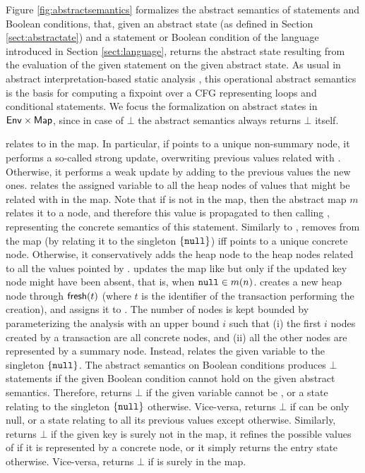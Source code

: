 Figure \ref{fig:abstractsemantics} formalizes the abstract semantics of statements and Boolean conditions, that, given an abstract state (as defined in Section \ref{sect:abstractate}) and a statement or Boolean condition of the language introduced in Section \ref{sect:language}, returns the abstract state resulting from the evaluation of the given statement on the given abstract state.
As usual in abstract interpretation-based static analysis \cite{CC77}, this operational abstract semantics is the basis for computing a fixpoint over a CFG representing loops and conditional statements.
We focus the formalization on abstract states in $\mathsf{Env} \times \mathsf{Map}$, since in case of $\bot$ the abstract semantics always returns $\bot$ itself.

 relates  to  in the map. In particular, if  points to a unique non-summary node, it performs a so-called strong update, overwriting previous values related with . Otherwise, it performs a weak update by adding to the previous values the new ones.  relates the assigned variable  to all the heap nodes of values that might be related with  in the map. Note that if  is not in the map, then the abstract map $m$ relates it to a  node, and therefore this value is propagated to  then calling , representing the concrete semantics of this statement. Similarly to ,  removes  from the map (by relating it to the singleton $\{\mathtt{null}\}$) iff  points to a unique concrete node. Otherwise, it conservatively adds the heap node  to the heap nodes related to all the values pointed by .  updates the map like  but only if the updated key node might have been absent, that is, when $\mathtt{null} \in m(n)$.  creates a new heap node through $\mathsf{fresh}(t)$ (where $t$ is the identifier of the transaction performing the creation), and assigns it to . The number of nodes is kept bounded by parameterizing the analysis with an upper bound $i$ such that (i) the first $i$ nodes created by a transaction are all concrete nodes, and (ii) all the other nodes are represented by a summary node. Instead,  relates the given variable to the singleton $\{\mathtt{null}\}$.
The abstract semantics on Boolean conditions produces $\bot$ statements if the given Boolean condition cannot hold on the given abstract semantics. Therefore,  returns $\bot$ if the given variable  cannot be , or a state relating  to the singleton $\{\mathtt{null}\}$ otherwise. Vice-versa,  returns $\bot$ if  can be only null, or a state relating  to all its previous values except  otherwise.
Similarly,  returns $\bot$ if the given key  is surely not in the map, it refines the possible values of  if it is represented by a concrete node, or it simply returns the entry state otherwise. Vice-versa,  returns $\bot$ if  is surely in the map.


